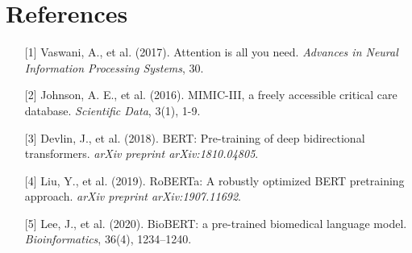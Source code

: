 \documentclass[twocolumn]{article}
\begin{document}
\section*{References}
\begin{enumerate}
    \item[{[1]}] Vaswani, A., et al. (2017). Attention is all you need. \textit{Advances in Neural Information Processing Systems}, 30.
    \item[{[2]}] Johnson, A. E., et al. (2016). MIMIC-III, a freely accessible critical care database. \textit{Scientific Data}, 3(1), 1-9.
    \item[{[3]}] Devlin, J., et al. (2018). BERT: Pre-training of deep bidirectional transformers. \textit{arXiv preprint arXiv:1810.04805}.
    \item[{[4]}] Liu, Y., et al. (2019). RoBERTa: A robustly optimized BERT pretraining approach. \textit{arXiv preprint arXiv:1907.11692}.
    \item[{[5]}] Lee, J., et al. (2020). BioBERT: a pre-trained biomedical language model. \textit{Bioinformatics}, 36(4), 1234–1240.
\end{enumerate}
\end{document}
